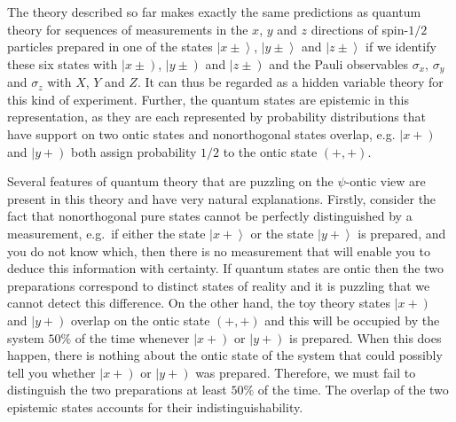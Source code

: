 \documentclass[DIV=calc,fontsize=12pt]{scrartcl} %
\theoremstyle{definition}
\theoremstyle{plain}
\newcommand{\RKet}[1]{\ensuremath{\left \vert #1 \right )}}
\newcommand{\Ket}[1]{\ensuremath{\left \vert #1 \right \rangle}}
\begin{document}
The theory described so far makes exactly the same predictions as
quantum theory for sequences of measurements in the $x$, $y$ and $z$
directions of spin-$1/2$ particles prepared in one of the states
$\Ket{x \pm}$, $\Ket{y \pm}$ and $\Ket{z \pm}$ if we identify these
six states with $\RKet{x \pm}$, $\RKet{y \pm}$ and $\RKet{z \pm}$ and
the Pauli observables $\sigma_x$, $\sigma_y$ and $\sigma_z$ with $X$,
$Y$ and $Z$.  It can thus be regarded as a hidden variable theory for
this kind of experiment.  Further, the quantum states are epistemic in
this representation, as they are each represented by probability
distributions that have support on two ontic states and nonorthogonal
states overlap, e.g. $\RKet{x+}$ and $\RKet{y+}$ both assign
probability $1/2$ to the ontic state $(+,+)$.

Several features of quantum theory that are puzzling on the
$\psi$-ontic view are present in this theory and have very natural
explanations.  Firstly, consider the fact that nonorthogonal pure
states cannot be perfectly distinguished by a measurement, e.g.\ if
either the state $\Ket{x+}$ or the state $\Ket{y+}$ is prepared, and
you do not know which, then there is no measurement that will enable
you to deduce this information with certainty.  If quantum states are
ontic then the two preparations correspond to distinct states of
reality and it is puzzling that we cannot detect this difference.  On
the other hand, the toy theory states $\RKet{x+}$ and $\RKet{y+}$
overlap on the ontic state $(+,+)$ and this will be occupied by the
system $50\%$ of the time whenever $\RKet{x+}$ or $\RKet{y+}$ is
prepared.  When this does happen, there is nothing about the ontic
state of the system that could possibly tell you whether $\RKet{x+}$
or $\RKet{y+}$ was prepared.  Therefore, we must fail to distinguish
the two preparations at least $50\%$ of the time.  The overlap of the
two epistemic states accounts for their indistinguishability.
\end{document}
